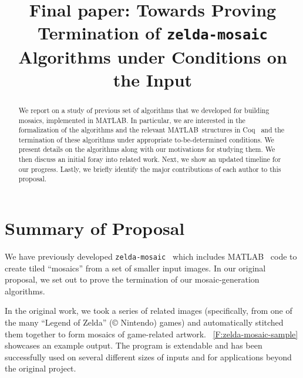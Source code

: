 \documentclass[11pt,conference]{IEEEtran}
\newcommand{\matlab}{MATLAB}
\begin{document}
\title{Final paper: Towards Proving Termination of \texttt{zelda-mosaic} Algorithms under Conditions on the Input}

\author{
\and
{}
}

\maketitle

\begin{abstract}
    We report on a study of previous set of algorithms that we developed for
    building mosaics, implemented in \matlab\@. In particular, we are interested
    in the formalization of the algorithms and the relevant \matlab\ structures
    in Coq~\cite{Coq} and the termination of these algorithms under appropriate
    to-be-determined conditions. We present details on the algorithms along with
    our motivations for studying them. We then discuss an initial foray into
    related work. Next, we show an updated timeline for our progress. Lastly, we
    briefly identify the major contributions of each author to this proposal.
\end{abstract}


\section{Summary of Proposal}

We have previously developed \texttt{zelda-mosaic}~\cite{zelda_mosaic} which
includes \matlab~\cite{matlab} code to create tiled ``mosaics'' from a set of
smaller input images. In our original proposal, we set out to prove the
termination of our mosaic-generation algorithms.

In the original work, we took a series of related images (specifically, from one
of the many ``Legend of Zelda'' ({\copyright} Nintendo) games) and automatically
stitched them together to form mosaics of game-related artwork.
\figurename~\ref{F:zelda-mosaic-sample} showcases an example output. The program
is extendable and has been successfully used on several different sizes of
inputs and for applications beyond the original project.
\end{document}
